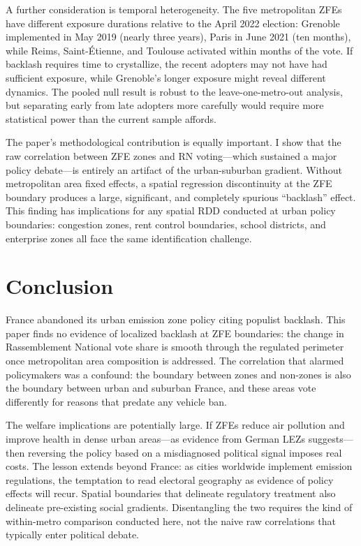 \documentclass[12pt]{article}
\begin{document}
A further consideration is temporal heterogeneity. The five metropolitan ZFEs have different exposure durations relative to the April 2022 election: Grenoble implemented in May 2019 (nearly three years), Paris in June 2021 (ten months), while Reims, Saint-\'{E}tienne, and Toulouse activated within months of the vote. If backlash requires time to crystallize, the recent adopters may not have had sufficient exposure, while Grenoble's longer exposure might reveal different dynamics. The pooled null result is robust to the leave-one-metro-out analysis, but separating early from late adopters more carefully would require more statistical power than the current sample affords.

The paper's methodological contribution is equally important. I show that the raw correlation between ZFE zones and RN voting---which sustained a major policy debate---is entirely an artifact of the urban-suburban gradient. Without metropolitan area fixed effects, a spatial regression discontinuity at the ZFE boundary produces a large, significant, and completely spurious ``backlash'' effect. This finding has implications for any spatial RDD conducted at urban policy boundaries: congestion zones, rent control boundaries, school districts, and enterprise zones all face the same identification challenge.

\section{Conclusion}

France abandoned its urban emission zone policy citing populist backlash. This paper finds no evidence of localized backlash at ZFE boundaries: the change in Rassemblement National vote share is smooth through the regulated perimeter once metropolitan area composition is addressed. The correlation that alarmed policymakers was a confound: the boundary between zones and non-zones is also the boundary between urban and suburban France, and these areas vote differently for reasons that predate any vehicle ban.

The welfare implications are potentially large. If ZFEs reduce air pollution and improve health in dense urban areas---as evidence from German LEZs suggests---then reversing the policy based on a misdiagnosed political signal imposes real costs. The lesson extends beyond France: as cities worldwide implement emission regulations, the temptation to read electoral geography as evidence of policy effects will recur. Spatial boundaries that delineate regulatory treatment also delineate pre-existing social gradients. Disentangling the two requires the kind of within-metro comparison conducted here, not the naive raw correlations that typically enter political debate.
\end{document}
